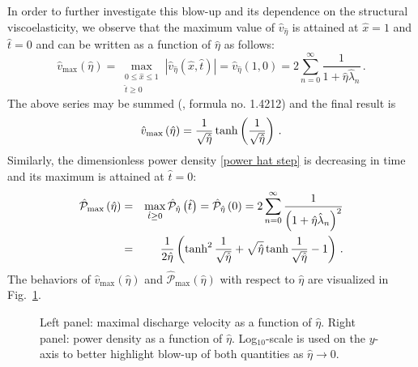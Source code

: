 \documentclass[12pt,a4paper]{amsart}
\theoremstyle{definition}
\newcommand{\hx}{\hat{x}}
\newcommand{\hatt}{\hat{t}}
\newcommand{\heta}{\hat{\eta}}
\newcommand{\hv}{\hat{v}}
\newcommand{\hlambda}{\hat{\lambda}}
\begin{document}
In order to further investigate this blow-up and its dependence on the structural viscoelasticity, we observe that the maximum value of $\hv_{\heta}$ is attained at $\hx=1$ and $\hatt=0$ and can be written as a function of $\heta$ as follows:
\begin{equation*}
\hat{v}_{\max }\left( \hat{\eta}\right) =\max_{\substack{ 0\leq \hx\leq 1 \\ \hatt \geq 0}}\left\vert
\hv_{\heta }\left( \hx,\hatt\right) \right\vert =\hv_{\heta }\left( 1,0\right)
=2\sum_{n=0}^{\infty }\frac{1}{1+\heta \hlambda _{n}}\,.
\end{equation*}
The above series may be summed (\cite{Gradshteyn-Ryzhik}, formula no. 1.4212) and the final result is
\begin{equation}
\hat{v}_{\max }\left( \hat{\eta}\right) =\frac{1}{\sqrt{\hat{\eta}}}\tanh \left( \frac{1}{%
\sqrt{\hat{\eta}}}\right) \label{M(eta)}\,.
\end{equation}
Similarly, the dimensionless power density \eqref{power hat step} is decreasing in time and its
maximum is attained at $\hat{t}=0$:%
\begin{eqnarray*}
\hat{\mathcal{P}}_{\max }\left( \hat{\eta}\right)  &=&\max_{\hat{t}\geq 0}%
\hat{\mathcal{P}}_{\hat{\eta}}\left( \hat{t}\right) =\hat{\mathcal{P}}_{\hat{%
\eta}}\left( 0\right) =2\sum_{n=0}^{\infty }\frac{1}{\left( 1+\hat{\eta}\hat{%
\lambda}_{n}\right) ^{2}} \\
&=&\frac{1}{2\hat{\eta}}\left( \tanh ^{2}\frac{1}{\sqrt{\hat{\eta}}}+\sqrt{%
\hat{\eta}}\tanh \frac{1}{\sqrt{\hat{\eta}}}-1\right)\,.
\end{eqnarray*}%
The behaviors of $\hat{v}_{\max }\left( \hat{\eta}\right) $ and $\hat{\mathcal{P}}_{\max }\left( \hat{\eta}\right) $ with respect to $\heta$ are visualized in Fig.~\ref{fig:M_eta_step_pulse}.
\begin{figure}[h!]
\begin{center}
\caption{Left panel: maximal discharge velocity as a function of $\heta$.
Right panel: power density as a function of $\heta$. Log$_{10}$-scale
is used on the $y$-axis to
better highlight blow-up of both quantities as $\hat{\eta} \rightarrow 0$.}
\label{fig:M_eta_step_pulse}
\end{center}
\end{figure}
\end{document}
